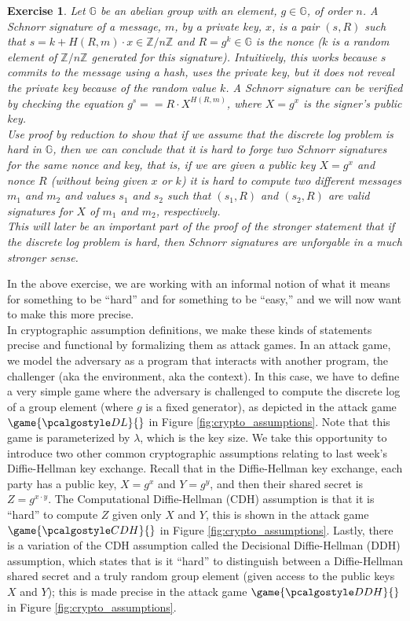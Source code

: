 \documentclass[12pt]{article}
\newcommand{\Z}[0]{\mathbb{Z}}
\newcommand{\G}[0]{\mathbb{G}}
\newtheorem{exercise}{Exercise}
\theoremstyle{definition}
\theoremstyle{remark}
\theoremstyle{definition}
\begin{document}
\begin{exercise}\label{ex:nonce-reuse}
Let $\G$ be an abelian group with an element, $g\in\G$, of order $n$. A Schnorr signature of a message, $m$, by a private key, $x$, is a pair $(s, R)$ such that $s = k + H(R, m)\cdot x\in \Z/n\Z$ and $R = g^k\in\G$ is the nonce ($k$ is a random element of $\Z/n\Z$ generated for this signature). Intuitively, this works because $s$ commits to the message using a hash, uses the private key, but it does not reveal the private key because of the random value $k$. A Schnorr signature can be verified by checking the equation $g^s == R\cdot X^{H(R, m)}$, where $X = g^x$ is the signer's public key.\\
Use proof by reduction to show that if we assume that the discrete log problem is hard in $\G$, then we can conclude that it is hard to forge two Schnorr signatures for the same nonce and key, that is, if we are given a public key $X = g^x$ and nonce $R$ (without being given $x$ or $k$) it is hard to compute two different messages $m_1$ and $m_2$ and values $s_1$ and $s_2$ such that $(s_1, R)$ and $(s_2, R)$ are valid signatures for $X$ of $m_1$ and $m_2$, respectively.\\
This will later be an important part of the proof of the stronger statement that if the discrete log problem is hard, then Schnorr signatures are unforgable in a much stronger sense.
\end{exercise}

In the above exercise, we are working with an informal notion of what it means for something to be ``hard'' and for something to be ``easy,'' and we will now want to make this more precise.\\

In cryptographic assumption definitions, we make these kinds of statements precise and functional by formalizing them as attack games. In an attack game, we model the adversary as a program that interacts with another program, the challenger (aka the environment, aka the context). In this case, we have to define a very simple game where the adversary is challenged to compute the discrete log of a group element (where $g$ is a fixed generator), as depicted in the attack game $\game{\algo{DL}}{}$ in Figure \ref{fig:crypto_assumptions}. Note that this game is parameterized by $\lambda$, which is the key size. We take this opportunity to introduce two other common cryptographic assumptions relating to last week's Diffie-Hellman key exchange. Recall that in the Diffie-Hellman key exchange, each party has a public key, $X = g^x$ and $Y = g^y$, and then their shared secret is $Z = g^{x\cdot y}$. The Computational Diffie-Hellman (CDH) assumption is that it is ``hard'' to compute $Z$ given only $X$ and $Y$, this is shown in the attack game $\game{\algo{CDH}}{}$ in Figure \ref{fig:crypto_assumptions}. Lastly, there is a variation of the CDH assumption called the Decisional Diffie-Hellman (DDH) assumption, which states that is it ``hard'' to distinguish between a Diffie-Hellman shared secret and a truly random group element (given access to the public keys $X$ and $Y$); this is made precise in the attack game $\game{\algo{DDH}}{}$ in Figure \ref{fig:crypto_assumptions}.
\end{document}
